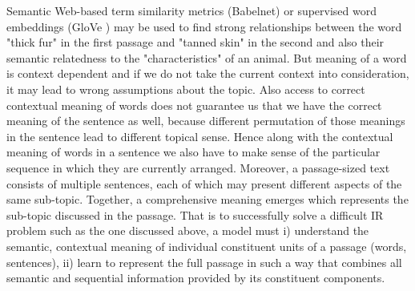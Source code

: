 Semantic Web-based term similarity metrics (Babelnet) or supervised word embeddings (GloVe \cite{pennington2014glove}) may be used to find strong relationships between the word "thick fur" in the first passage and "tanned skin" in the second and also their semantic relatedness to the "characteristics" of an animal. But meaning of a word is context dependent and if we do not take the current context into consideration, it may lead to wrong assumptions about the topic. Also access to correct contextual meaning of words does not guarantee us that we have the correct meaning of the sentence as well, because different permutation of those meanings in the sentence lead to different topical sense. Hence along with the contextual meaning of words in a sentence we also have to make sense of the particular sequence in which they are currently arranged. Moreover, a passage-sized text consists of multiple sentences, each of which may present different aspects of the same sub-topic. Together, a comprehensive meaning emerges which represents the sub-topic discussed in the passage. That is to successfully solve a difficult IR problem such as the one discussed above, a model must i) understand the semantic, contextual meaning of individual constituent units of a passage (words, sentences), ii) learn to represent the full passage in such a way that combines all semantic and sequential information provided by its constituent components.

